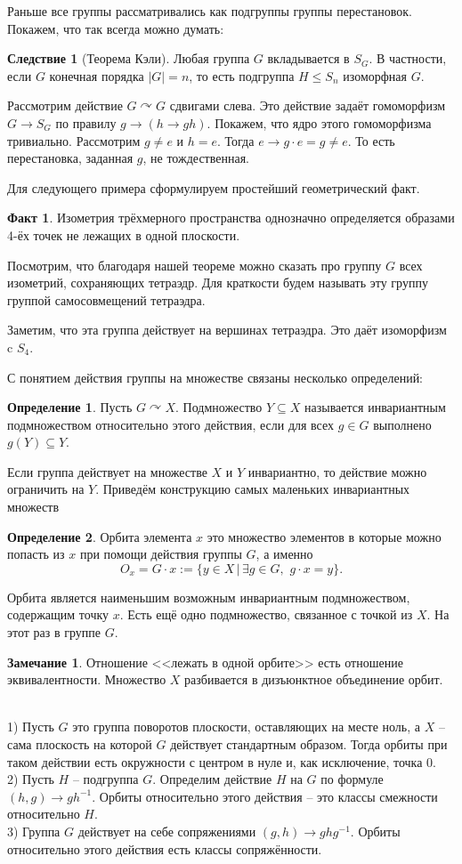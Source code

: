 \documentclass[10pt,a4paper,oneside]{book}
\theoremstyle{definition}
\newtheorem*{rem}{\color{green!50!blue}Замечание}
\newtheorem*{defn}{\color{yellow!30!red} Определение}
\newtheorem*{fact}{Факт}
\newtheorem{cor}{\color{green!45!black}Следствие}
\renewcommand{\leq}{\leqslant}
\def\exm{\noindent {\bf Примеры:}}
\def\dfn{\begin{defn}}
\def\edfn{\end{defn}}
\def\crl{\begin{cor}}
\def\ecrl{\end{cor}}
\def\rm{\begin{rem}}
\def\erm{\end{rem}}
\def\fct{\begin{fact}}
\def\efct{\end{fact}}
\begin{document}
Раньше все группы рассматривались как подгруппы группы перестановок. Покажем, что так всегда можно думать:

\crl[Теорема Кэли] Любая  группа $G$ вкладывается в $S_G$. В частности, если $G$ конечная порядка $|G|=n$, то есть подгруппа  $H \leq S_n$ изоморфная $G$.
\ecrl
\proof Рассмотрим действие $G \curvearrowright G$ сдвигами слева. Это действие задаёт гомоморфизм $G \to S_G$ по правилу $g\to (h \to gh)$. Покажем, что ядро этого гомоморфизма тривиально. Рассмотрим $g\neq e$ и $h=e$. Тогда $e \to g\cdot e=g \neq e$. То есть перестановка, заданная $g$, не тождественная. 
\endproof

Для следующего примера сформулируем простейший геометрический факт.

\fct Изометрия трёхмерного пространства однозначно определяется образами 4-ёх точек не лежащих в одной плоскости.
\efct

Посмотрим, что благодаря нашей теореме можно сказать про группу $G$ всех изометрий, сохраняющих тетраэдр. Для краткости будем называть эту группу группой самосовмещений тетраэдра. 

Заметим, что эта группа действует на вершинах тетраэдра. Это даёт изоморфизм c $S_4$. 


\noindent С понятием действия группы на множестве связаны несколько определений:

\dfn Пусть $G\curvearrowright X$. Подмножество $Y\subseteq X$ называется инвариантным подмножеством относительно этого действия, если для всех $g\in G$ выполнено $g(Y)\subseteq Y$.
\edfn

Если группа действует на множестве $X$ и $Y$ инвариантно, то действие можно ограничить на $Y$. Приведём конструкцию самых маленьких инвариантных множеств


\dfn
Орбита элемента $x$ это множество элементов в которые можно попасть из $x$ при помощи действия группы $G$, а именно
$$O_x=G\cdot x:=\{y\in X \,|\, \exists g\in G, \,\, g\cdot x=y\}.$$
\edfn

Орбита является наименьшим возможным инвариантным подмножеством, содержащим точку $x$. Есть ещё одно подмножество, связанное с точкой из $X$. На этот раз в группе $G$.

\rm Отношение <<лежать в одной орбите>> есть отношение эквивалентности. Множество $X$ разбивается в дизъюнктное объединение орбит.
\erm

\exm\\
1) Пусть $G$ это группа поворотов плоскости, оставляющих на месте ноль, а $X$ -- сама плоскость на которой $G$ действует стандартным образом. Тогда орбиты при таком действии есть окружности с центром в нуле и, как исключение, точка $0$.\\
2) Пусть $H$ -- подгруппа $G$. Определим действие $H$ на $G$ по формуле $(h,g) \to gh^{-1}$. Орбиты относительно этого действия  -- это классы смежности относительно $H$.\\
3) Группа $G$ действует на себе сопряжениями $(g,h) \to ghg^{-1}$. Орбиты относительно этого действия есть классы сопряжённости.\\
\end{document}

